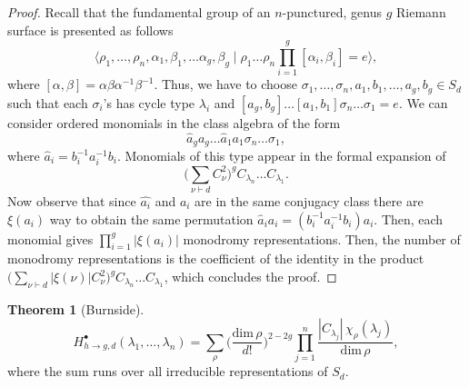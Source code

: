\documentclass[12pt,a4paper,openright,twoside]{report}
\theoremstyle{definition} %
\newtheorem{theorem}{Theorem}[chapter]
\begin{document}
\begin{proof}
    Recall that the fundamental group of an \(n\)-punctured, genus \(g\) Riemann surface is presented as follows
    \[
    \langle \rho_1, \ldots, \rho_n, \alpha_1, \beta_1, \ldots \alpha_g, \beta_g \mid \rho_1 \ldots \rho_n \prod_{i=1}^g [\alpha_i, \beta_i] = e \rangle,
    \]
    where \([\alpha, \beta] = \alpha \beta \alpha^{-1} \beta^{-1}\). Thus, we have to choose \(\sigma_1, \ldots, \sigma_n, a_1,b_1, \ldots, a_g,b_g \in S_d\) such that each \(\sigma_i\)'s has cycle type \(\lambda_i\) and \( [a_g, b_g] \ldots [a_1,b_1]\sigma_n \ldots \sigma_1 = e\).
    We can consider ordered monomials in the class algebra of the form
    \[
    \hat{a}_g a_g\ldots \hat{a}_1a_1\sigma_n \ldots \sigma_1,
    \]
    where \(\hat{a}_i = b_i^{-1}a_i^{-1}b_i\).
    Monomials of this type appear in the formal expansion of
    \[
    \bigl(\sum_{\nu \vdash d} C_{\nu}^2\bigr)^g C_{\lambda_n} \ldots C_{\lambda_1}.
    \]
    Now observe that since \(\hat{a_i}\) and \(a_i\) are in the same conjugacy class there are \(\xi(a_i)\) way to obtain the same permutation \(\hat{a}_i a_i = (b_i^{-1}a_i^{-1}b_i)a_i\). Then, each monomial gives \(\prod_{i=1}^g |\xi(a_i)|\) monodromy representations. Then, the number of monodromy representations is the coefficient of the identity in the product
    \(\bigl(\sum_{\nu \vdash d}|\xi(\nu)| C_{\nu}^2\bigr)^g C_{\lambda_n} \ldots C_{\lambda_1}\), which concludes the proof.
\end{proof}

\begin{theorem}[Burnside]
    \[
    H_{h \to g , d}^{\bullet}(\lambda_1, \ldots, \lambda_n) =
    \sum_{\rho} \biggl(\frac{\text{dim}\, \rho}{d!}\biggr)^{2-2g} \prod_{j=1}^n
    \frac{|C_{\lambda_j}| \, \chi_{\rho}(\lambda_j)}{\text{dim}\,\rho},
    \]
    where the sum runs over all irreducible representations of \(S_d\).
\end{theorem}
\end{document}
